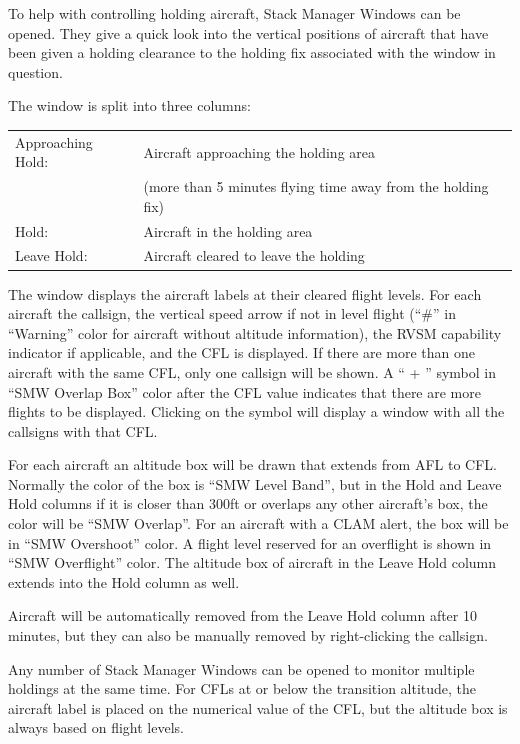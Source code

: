 \documentclass[11pt,a4paper,oldfontcommands]{memoir}
\begin{document}
To help with controlling holding aircraft, Stack Manager Windows can be opened. They give a quick look into the vertical positions of aircraft that have been given a holding clearance to the holding fix associated with the window in question.

The window is split into three columns:

\begin{tabular}{l l}
    Approaching Hold:   & Aircraft approaching the holding area\\
                        & (more than 5 minutes flying time away from the holding fix)\\
    Hold:               & Aircraft in the holding area\\
    Leave Hold:         & Aircraft cleared to leave the holding\\   
\end{tabular}

The window displays the aircraft labels at their cleared flight levels. For each aircraft the callsign, the vertical speed arrow if not in level flight (“\#” in “Warning” color for aircraft without altitude information), the RVSM capability indicator if applicable, and the CFL is displayed. If there are more than one aircraft with the same CFL, only one callsign will be shown. A “ + ” symbol in “SMW Overlap Box” color after the CFL value indicates that there are more flights to be displayed. Clicking on the symbol will display a window with all the callsigns with that CFL.

For each aircraft an altitude box will be drawn that extends from AFL to CFL. Normally the color of the box is “SMW Level Band”, but in the Hold and Leave Hold columns if it is closer than 300ft or overlaps any other aircraft’s box, the color will be “SMW Overlap”. For an aircraft with a CLAM alert, the box will be in “SMW Overshoot” color. A flight level reserved for an overflight is shown in “SMW Overflight” color. The altitude box of aircraft in the Leave Hold column extends into the Hold column as well.

Aircraft will be automatically removed from the Leave Hold column after 10 minutes, but they can also be manually removed by right-clicking the callsign.

Any number of Stack Manager Windows can be opened to monitor multiple holdings at the same time. For CFLs at or below the transition altitude, the aircraft label is placed on the numerical value of the CFL, but the altitude box is always based on flight levels.
\end{document}
